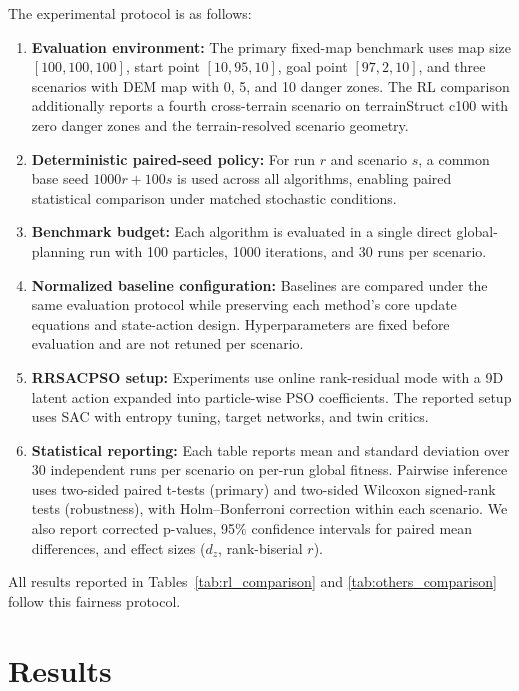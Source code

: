 \documentclass[final,5p,times]{elsarticle}
\begin{document}
The experimental protocol is as follows:
\begin{enumerate}
\item \textbf{Evaluation environment:} The primary fixed-map benchmark uses map size $[100,100,100]$, start point $[10,95,10]$, goal point $[97,2,10]$, and three scenarios with DEM map with 0, 5, and 10 danger zones. The RL comparison additionally reports a fourth cross-terrain scenario on terrainStruct c100 with zero danger zones and the terrain-resolved scenario geometry.
\item \textbf{Deterministic paired-seed policy:} For run $r$ and scenario $s$, a common base seed $1000r + 100s$ is used across all algorithms, enabling paired statistical comparison under matched stochastic conditions.
\item \textbf{Benchmark budget:} Each algorithm is evaluated in a single direct global-planning run with 100 particles, 1000 iterations, and 30 runs per scenario.
\item \textbf{Normalized baseline configuration:} Baselines are compared under the same evaluation protocol while preserving each method's core update equations and state-action design. Hyperparameters are fixed before evaluation and are not retuned per scenario.
\item \textbf{RRSACPSO setup:} Experiments use online rank-residual mode with a 9D latent action expanded into particle-wise PSO coefficients. The reported setup uses SAC with entropy tuning, target networks, and twin critics.
\item \textbf{Statistical reporting:} Each table reports mean and standard deviation over 30 independent runs per scenario on per-run global fitness. Pairwise inference uses two-sided paired t-tests (primary) and two-sided Wilcoxon signed-rank tests (robustness), with Holm--Bonferroni correction within each scenario. We also report corrected p-values, 95\% confidence intervals for paired mean differences, and effect sizes ($d_z$, rank-biserial $r$).
\end{enumerate}
All results reported in Tables~\ref{tab:rl_comparison} and \ref{tab:others_comparison} follow this fairness protocol.

\section{Results}
\label{sec:results}
\end{document}
